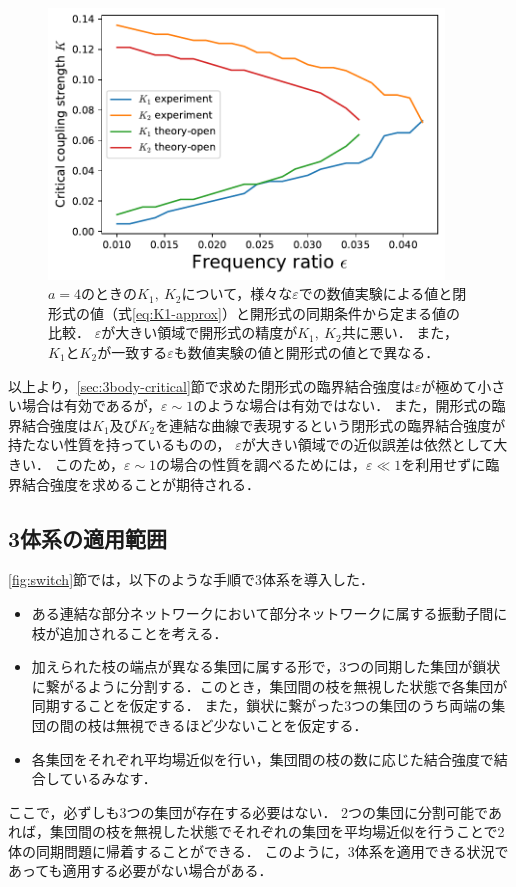 \documentclass[../main]{subfiles}
\begin{document}
\begin{figure}[tbp]
\centering
\includegraphics[width=105mm]{./images/k1k2-compare.pdf}
\centering
\caption{$a=4$のときの$K_1,\ K_2$について，様々な$\varepsilon$での数値実験による値と閉形式の値（式\eqref{eq:K1-approx}）と開形式の同期条件から定まる値の比較．
$\varepsilon$が大きい領域で開形式の精度が$K_1,\ K_2$共に悪い．
また，$K_1$と$K_2$が一致する$\varepsilon$も数値実験の値と開形式の値とで異なる．}
\label{fig:k1k2-compare}
\end{figure}

以上より，\ref{sec:3body-critical}節で求めた閉形式の臨界結合強度は$\varepsilon$が極めて小さい場合は有効であるが，$\varepsilon\sim 1$のような場合は有効ではない．
また，開形式の臨界結合強度は$K_1$及び$K_2$を連結な曲線で表現するという閉形式の臨界結合強度が持たない性質を持っているものの，
$\varepsilon$が大きい領域での近似誤差は依然として大きい．
このため，$\varepsilon\sim 1$の場合の性質を調べるためには，$\varepsilon\ll 1$を利用せずに臨界結合強度を求めることが期待される．

\subsection{3体系の適用範囲}
\label{sec:3body-application}
\ref{fig:switch}節では，以下のような手順で3体系を導入した．
\begin{itemize}
    \item ある連結な部分ネットワークにおいて部分ネットワークに属する振動子間に枝が追加されることを考える．
    \item 加えられた枝の端点が異なる集団に属する形で，3つの同期した集団が鎖状に繋がるように分割する．このとき，集団間の枝を無視した状態で各集団が同期することを仮定する．
    また，鎖状に繋がった3つの集団のうち両端の集団の間の枝は無視できるほど少ないことを仮定する．
    \item 各集団をそれぞれ平均場近似を行い，集団間の枝の数に応じた結合強度で結合しているみなす．
\end{itemize}
ここで，必ずしも3つの集団が存在する必要はない．
2つの集団に分割可能であれば，集団間の枝を無視した状態でそれぞれの集団を平均場近似を行うことで2体の同期問題に帰着することができる．
このように，3体系を適用できる状況であっても適用する必要がない場合がある．
\end{document}
